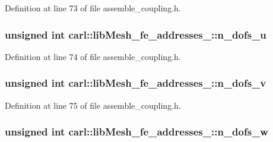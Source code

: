 Definition at line 73 of file assemble\+\_\+coupling.\+h.

\hypertarget{classcarl_1_1lib_mesh__fe__addresses__3_a4f131cedd24e8c5ec44bfbb50acf8b17}{}
\subsubsection[{n\+\_\+dofs\+\_\+u}]{\setlength{\rightskip}{0pt plus 5cm}unsigned int carl\+::lib\+Mesh\+\_\+fe\+\_\+addresses\+\_\+::n\+\_\+dofs\+\_\+u}\label{classcarl_1_1lib_mesh__fe__addresses__3_a4f131cedd24e8c5ec44bfbb50acf8b17}


Definition at line 74 of file assemble\+\_\+coupling.\+h.

\hypertarget{classcarl_1_1lib_mesh__fe__addresses__3_a8e5c89ad957ccce0c03fcc14f51ab4ba}{}
\subsubsection[{n\+\_\+dofs\+\_\+v}]{\setlength{\rightskip}{0pt plus 5cm}unsigned int carl\+::lib\+Mesh\+\_\+fe\+\_\+addresses\+\_\+::n\+\_\+dofs\+\_\+v}\label{classcarl_1_1lib_mesh__fe__addresses__3_a8e5c89ad957ccce0c03fcc14f51ab4ba}


Definition at line 75 of file assemble\+\_\+coupling.\+h.

\hypertarget{classcarl_1_1lib_mesh__fe__addresses__3_ac62177ed269417b444a1174e142b48fa}{}
\subsubsection[{n\+\_\+dofs\+\_\+w}]{\setlength{\rightskip}{0pt plus 5cm}unsigned int carl\+::lib\+Mesh\+\_\+fe\+\_\+addresses\+\_\+::n\+\_\+dofs\+\_\+w}\label{classcarl_1_1lib_mesh__fe__addresses__3_ac62177ed269417b444a1174e142b48fa}


